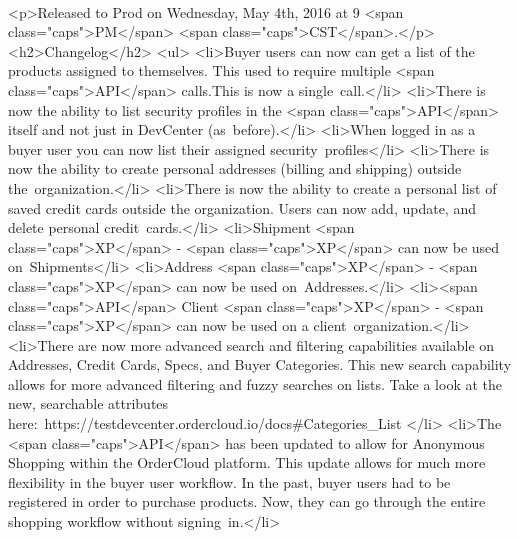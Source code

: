 \documentclass{memoir}%
\begin{document}
\paragraph*{}%

%
\paragraph*{}%
<p>Released to Prod on Wednesday, May 4th, 2016 at 9 <span class="caps">PM</span> <span class="caps">CST</span>.</p>\newline%
<h2>Changelog</h2>\newline%
<ul>\newline%
<li>Buyer users can now can get a list of the products assigned to themselves. This used to require multiple <span class="caps">API</span> calls.This is now a single~call.</li>\newline%
<li>There is now the ability to list security profiles in the <span class="caps">API</span> itself and not just in DevCenter (as~before).</li>\newline%
<li>When logged in as a buyer user you can now list their assigned security~profiles</li>\newline%
<li>There is now the ability to create personal addresses (billing and shipping) outside the~organization.</li>\newline%
<li>There is now the ability to create a personal list of saved credit cards outside the organization. Users can now add, update, and delete personal credit~cards.</li>\newline%
<li>Shipment <span class="caps">XP</span> {-} <span class="caps">XP</span> can now be used on~Shipments</li>\newline%
<li>Address <span class="caps">XP</span> {-} <span class="caps">XP</span> can now be used on~Addresses.</li>\newline%
<li><span class="caps">API</span> Client <span class="caps">XP</span> {-} <span class="caps">XP</span> can now be used on a client~organization.</li>\newline%
<li>There are now more advanced search and filtering capabilities available on Addresses, Credit Cards, Specs, and Buyer Categories. This new search capability allows for more advanced filtering and fuzzy searches on lists. Take a look at the new, searchable attributes here:~https://testdevcenter.ordercloud.io/docs\#Categories\_List </li>\newline%
<li>The <span class="caps">API</span> has been updated to allow for Anonymous Shopping within the OrderCloud platform. This update allows for much more flexibility in the buyer user workflow. In the past, buyer users had to be registered in order to purchase products. Now, they can go through the entire shopping workflow without signing~in.</li>\newline%
\end{document}
